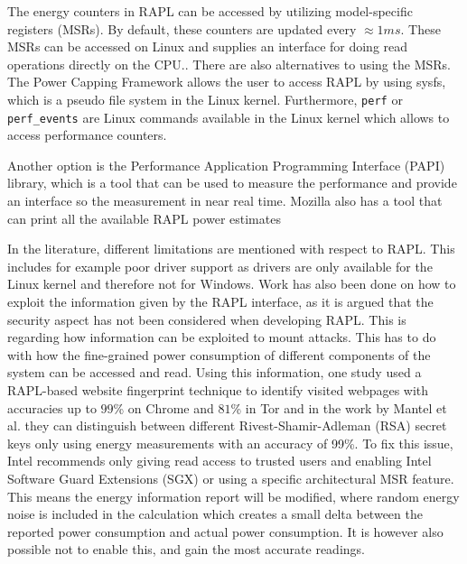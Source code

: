 

The energy counters in RAPL can be accessed by utilizing model-specific registers (MSRs). By default, these counters are updated every $\approx 1 ms$. These MSRs can be accessed on Linux and supplies an interface for doing read operations directly on the CPU.\cite{linux_manual_msr}. There are also alternatives to using the MSRs. The Power Capping Framework allows the user to access RAPL by using sysfs, which is a pseudo file system in the Linux kernel\cite{PowerCappingFramework,RAPL_in_action}. Furthermore, \texttt{perf} or \texttt{perf\_events} are Linux commands available in the Linux kernel which allows to access performance counters.\cite{Perf_events,RAPL_in_action}\newline

Another option is the Performance Application Programming Interface (PAPI) library, which is a tool that can be used to measure the performance and provide an interface so the measurement in near real time\cite{PAPI}.
Mozilla also has a tool that can print all the available RAPL power estimates\cite{FireFox}\nytafsnit



In the literature, different limitations are mentioned with respect to RAPL. This includes for example poor driver support as drivers are only available for the Linux kernel and therefore not for Windows.\cite{RAPL_in_action} Work has also been done on how to exploit the information given by the RAPL interface, as it is argued that the security aspect has not been considered when developing RAPL\cite[]{Zhang2021}. This is regarding how information can be exploited to mount attacks. This has to do with how the fine-grained power consumption of different components of the system can be accessed and read. Using this information, one study used a RAPL-based website fingerprint technique to identify visited webpages with accuracies up to $99$\% on Chrome and $81$\% in Tor\cite[]{Zhang2021} and in the work by Mantel et al.\cite[]{Mantel2018} they can distinguish between different Rivest-Shamir-Adleman (RSA) secret keys only using energy measurements with an accuracy of 99\%. To fix this issue, Intel recommends only giving read access to trusted users and enabling Intel Software Guard Extensions (SGX) or using a specific architectural MSR feature. This means the energy information report will be modified, where random energy noise is included in the calculation which creates a small delta between the reported power consumption and actual power consumption. It is however also possible not to enable this, and gain the most accurate readings.\cite[]{intel_rapl_security}

